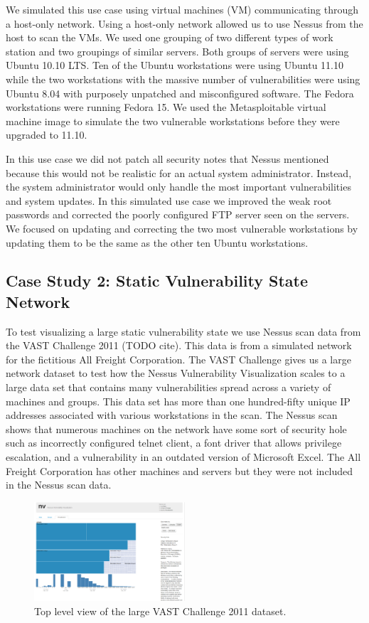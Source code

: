 \documentclass{acm_proc_article-sp}
\begin{document}
We simulated this use case using virtual machines (VM) communicating through a host-only
network. Using a host-only network allowed us to use Nessus from the host
to scan the VMs. We used one grouping of two different types of work station
and two groupings of similar servers. Both groups of servers were using Ubuntu 10.10 LTS.
Ten of the Ubuntu workstations were using Ubuntu 11.10 while the two workstations
with the massive number of vulnerabilities were using Ubuntu 8.04 with
purposely unpatched and misconfigured software.
The Fedora workstations were running Fedora 15.  We used the Metasploitable
virtual machine image to simulate the two vulnerable workstations before they
were upgraded to 11.10.

In this use case we did not patch all security notes that Nessus mentioned
because this would not be realistic for an actual system administrator. Instead,
the system administrator would only handle the most important vulnerabilities and
system updates. In this simulated use case we improved the weak root passwords
and corrected the poorly configured FTP server seen on the servers. We focused on updating
and correcting the two most vulnerable workstations by updating them to be the
same as the other ten Ubuntu workstations.



\subsection{Case Study 2: Static Vulnerability State Network }
To test visualizing a large static vulnerability state we use Nessus scan data from
the VAST Challenge 2011 (TODO cite). This data is from a simulated network for the
fictitious All Freight Corporation. The VAST Challenge gives us a large network
dataset to test how the Nessus Vulnerability Visualization scales to a large
data set that contains many vulnerabilities spread across a variety of machines and
groups. This data set has more than one
hundred-fifty unique IP addresses associated with various workstations in the
scan. The Nessus scan shows that numerous
machines on the network have some sort of security hole such as incorrectly
configured telnet client, a font driver that allows privilege escalation, and a
vulnerability in an outdated version of Microsoft Excel. The All Freight
Corporation has other machines and servers but they were not included in the
Nessus scan data.

\begin{figure}
  \label{VASTTopLevelFig}
  \centering
  \includegraphics[width=0.5\textwidth]{../screenshots/final/VastGroup}
  \caption{Top level view of the large VAST Challenge 2011 dataset.}
\end{figure}
\end{document}
